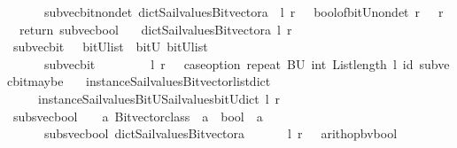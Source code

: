 \begin{isabellebody}
\ \ \ \ \ {\isachardoublequoteopen}\ sub{\isacharunderscore}vec{\isacharunderscore}bit{\isacharunderscore}nondet\ dict{\isacharunderscore}Sail{}{\isacharunderscore}values{\isacharunderscore}Bitvector{\isacharunderscore}a\ \ l\ r\ {\isacharequal}\ {\isacharparenleft}\ bool{\isacharunderscore}of{\isacharunderscore}bitU{\isacharunderscore}nondet\ r\ {\isasymbind}\ {\isacharparenleft}{\isasymlambda}\ r\ {\isachardot}\ \ return\ {\isacharparenleft}sub{\isacharunderscore}vec{\isacharunderscore}bool\ \isanewline
\ \ dict{\isacharunderscore}Sail{}{\isacharunderscore}values{\isacharunderscore}Bitvector{\isacharunderscore}a\ l\ r{\isacharparenright}{\isacharparenright}{\isacharparenright}{\isachardoublequoteclose}\isanewline
\isanewline
{}\isamarkupfalse%
\ sub{\isacharunderscore}vec{\isacharunderscore}bit\ \ {\isacharcolon}{\isacharcolon}\ {\isachardoublequoteopen}{\isacharparenleft}bitU{\isacharparenright}list\ {\isasymRightarrow}\ bitU\ {\isasymRightarrow}{\isacharparenleft}bitU{\isacharparenright}list\ {\isachardoublequoteclose}\ \ \ \isanewline
\ \ \ \ \ {\isachardoublequoteopen}\ sub{\isacharunderscore}vec{\isacharunderscore}bit\ \ \ \ \ \ \ \ \ l\ r\ {\isacharequal}\ {\isacharparenleft}\ case{\isacharunderscore}option\ {\isacharparenleft}repeat\ {\isacharbrackleft}BU{\isacharbrackright}\ {\isacharparenleft}int\ {\isacharparenleft}List{\isachardot}length\ l{\isacharparenright}{\isacharparenright}{\isacharparenright}\ id\ {\isacharparenleft}sub{\isacharunderscore}vec{\isacharunderscore}bit{\isacharunderscore}maybe\ \isanewline
\ \ {\isacharparenleft}instance{\isacharunderscore}Sail{}{\isacharunderscore}values{\isacharunderscore}Bitvector{\isacharunderscore}list{\isacharunderscore}dict\isanewline
\ \ \ \ \ instance{\isacharunderscore}Sail{}{\isacharunderscore}values{\isacharunderscore}BitU{\isacharunderscore}Sail{}{\isacharunderscore}values{\isacharunderscore}bitU{\isacharunderscore}dict{\isacharparenright}\ l\ r{\isacharparenright}{\isacharparenright}{\isachardoublequoteclose}\isanewline
\isanewline
\isanewline
{}\isamarkupfalse%
\ subs{\isacharunderscore}vec{\isacharunderscore}bool\ \ {\isacharcolon}{\isacharcolon}\ {\isachardoublequoteopen}\ {\isacharprime}a\ Bitvector{\isacharunderscore}class\ {\isasymRightarrow}\ {\isacharprime}a\ {\isasymRightarrow}\ bool\ {\isasymRightarrow}\ {\isacharprime}a\ {\isachardoublequoteclose}\ \ \ \isanewline
\ \ \ \ \ {\isachardoublequoteopen}\ subs{\isacharunderscore}vec{\isacharunderscore}bool\ dict{\isacharunderscore}Sail{}{\isacharunderscore}values{\isacharunderscore}Bitvector{\isacharunderscore}a\ \ \ \ \ \ \ l\ r\ {\isacharequal}\ {\isacharparenleft}\ arith{\isacharunderscore}op{\isacharunderscore}bv{\isacharunderscore}bool\ \isanewline

\end{isabellebody}
